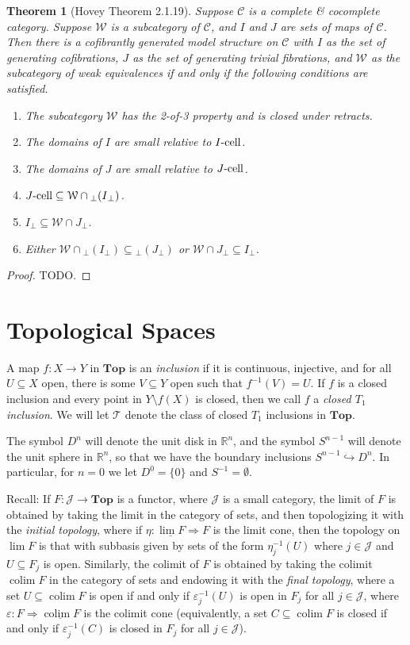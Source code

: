 \documentclass{amsart}
\theoremstyle{plain}
\newtheorem{theorem}{Theorem}[section]
\theoremstyle{definition}
\newcommand{\Top}{\mbf{Top}}
\newcommand{\sseq}{\subseteq}
\newcommand{\0}{\mathbf{0}}
\newcommand{\bR}{\mathbb{R}}
\newcommand{\cC}{\mathcal C}
\newcommand{\p}{{_\perp}}
\newcommand{\cJ}{\mathcal J}
\newcommand{\into}{\hookrightarrow}
\newcommand{\cT}{\mathcal T}
\newcommand{\cW}{\mathcal W}
\newcommand{\mbf}[1]{\mathbf{#1}}
\newcommand{\vare}{\varepsilon}
\renewcommand{\(}{\left(}
\renewcommand{\)}{\right)}
\newcommand{\cell}{\text-\mathrm{cell}}
\DeclareMathOperator*{\colim}{colim}
\begin{document}
\begin{theorem}[Hovey Theorem 2.1.19]\label{2.1.19}
  Suppose $\cC$ is a complete \& cocomplete category. Suppose $\cW$ is a subcategory of $\cC$, and $I$ and $J$ are sets of maps of $\cC$. Then there is a cofibrantly generated model structure on $\cC$ with $I$ as the set of generating cofibrations, $J$ as the set of generating trivial fibrations, and $\cW$ as the subcategory of weak equivalences if and only if the following conditions are satisfied.\begin{enumerate}[label=\arabic*.,noitemsep,topsep=0pt]
    \item The subcategory $\cW$ has the 2-of-3 property and is closed under retracts.
    \item The domains of $I$ are small relative to $I\cell$.
    \item The domains of $J$ are small relative to $J\cell$.
    \item $J\cell\sseq\cW\cap {\p(I\p)}$.
    \item $I\p\sseq\cW\cap J\p$.
    \item Either $\cW\cap {\p(I\p)}\sseq {\p(J\p)}$ or $\cW\cap J\p\sseq I\p$.
  \end{enumerate}
\end{theorem}
\begin{proof}
  \color{red}TODO.
\end{proof}

\section{Topological Spaces}

A map $f:X\to Y$ in $\Top$ is an \textit{inclusion} if it is continuous, injective, and for all $U\sseq X$ open, there is some $V\sseq Y$ open such that $f^{-1}(V)=U$. If $f$ is a closed inclusion and every point in $Y\setminus f(X)$ is closed, then we call $f$ a \textit{closed $T_1$ inclusion}. We will let $\cT$ denote the class of closed $T_1$ inclusions in $\Top$.

The symbol $D^n$ will denote the unit disk in $\bR^n$, and the symbol $S^{n-1}$ will denote the unit sphere in $\bR^n$, so that we have the boundary inclusions $S^{n-1}\into D^n$. In particular, for $n=0$ we let $D^0=\{0\}$ and $S^{-1}=\emptyset$.

Recall: If $F:\cJ\to\Top$ is a functor, where $\cJ$ is a small category, the limit of $F$ is obtained by taking the limit in the category of sets, and then topologizing it with the \textit{initial topology}, where if $\eta:\underline{\lim F}\Rightarrow F$ is the limit cone, then the topology on $\lim F$ is that with subbasis given by sets of the form $\eta_j^{-1}(U)$ where $j\in\cJ$ and $U\sseq F_j$ is open. Similarly, the colimit of $F$ is obtained by taking the colimit $\colim F$ in the category of sets and endowing it with the \textit{final topology}, where a set $U\sseq\colim F$ is open if and only if $\vare_j^{-1}(U)$ is open in $F_j$ for all $j\in\cJ$, where $\vare:F\Rightarrow\underline{\colim F}$ is the colimit cone (equivalently, a set $C\sseq\colim F$ is closed if and only if $\vare_j^{-1}(C)$ is closed in $F_j$ for all $j\in\cJ$).
\end{document}
